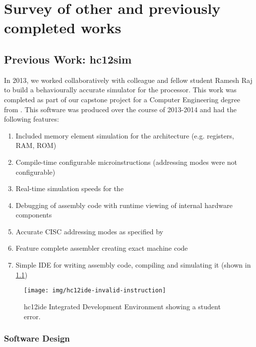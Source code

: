 \chapter{Survey of other and previously completed works}
\label{ch:prev-other-work}

\section{Previous Work: hc12sim}
\label{sec:review-prev-hc12}

In 2013, we worked collaboratively with colleague and fellow student Ramesh Raj to build a behaviourally accurate simulator for the \hcmodel{} processor. This work was completed as part of our capstone project for a Computer Engineering degree from \uwo{} \cite{Brightwell2013}. This software was produced over the course of 2013-2014 and had the following features: 

\begin{enumerate}
    \item Included memory element simulation for the \hcmodel{} architecture (e.g. registers, RAM, ROM)
    \item Compile-time configurable microinstructions (addressing modes were not configurable)
    \item Real-time simulation speeds for the \hcmodel{}
    \item Debugging of assembly code with runtime viewing of internal hardware components
    \item Accurate CISC addressing modes as specified by \hcmodel{}
    \item Feature complete assembler creating exact machine code
    \item Simple IDE for writing \hcmodel{} assembly code, compiling and simulating it (shown in \cref{fig:hc12ide-invalid-instruction})
\end{enumerate}

\begin{figure}[bh!]
    \centering
    \texttt{[image: img/hc12ide-invalid-instruction]}
    \caption{hc12ide Integrated Development Environment showing a student error.}
    \label{fig:hc12ide-invalid-instruction}
\end{figure}

\subsection{Software Design}

